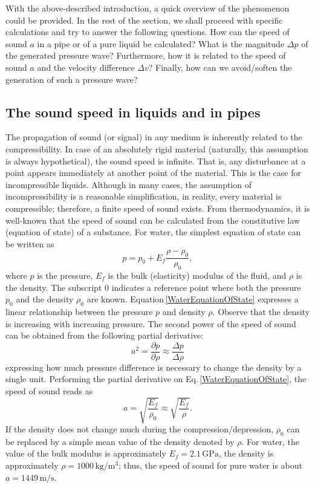 With the above-described introduction, a quick overview of the phenomenon could be provided. In the rest of the section, we shall proceed with specific calculations and try to answer the following questions. How can the speed of sound $a$ in a pipe or of a pure liquid be calculated? What is the magnitude $\Delta p$ of the generated pressure wave? Furthermore, how it is related to the speed of sound $a$ and the velocity difference $\Delta v$? Finally, how can we avoid/soften the generation of such a pressure wave?

\subsection{The sound speed in liquids and in pipes}
The propagation of sound (or signal) in any medium is inherently related to the compressibility. In case of an absolutely rigid material (naturally, this assumption is always hypothetical), the sound speed is infinite. That is, any disturbance at a point appears immediately at another point of the material. This is the case for incompressible liquids. Although in many cases, the assumption of incompressibility is a reasonable simplification, in reality, every material is compressible; therefore, a finite speed of sound exists. From thermodynamics, it is well-known that the speed of sound can be calculated from the constitutive law (equation of state) of a substance. For water, the simplest equation of state can be written as
%
\begin{equation} \label{WaterEquationOfState}
p = p_0 + E_f \frac{\rho - \rho_0}{\rho_0},
\end{equation}
%
where $p$ is the pressure, $E_f$ is the bulk (elasticity) modulus of the fluid, and $\rho$ is the density. The subscript $0$ indicates a reference point where both the pressure $p_0$ and the density $\rho_0$ are known. Equation\,\eqref{WaterEquationOfState} expresses a linear relationship between the pressure $p$ and density $\rho$. Observe that the density is increasing with increasing pressure. The second power of the speed of sound can be obtained from the following partial derivative:
%
\begin{equation}
a^2 = \frac{\partial p}{\partial \rho} \approx \frac{\Delta p}{\Delta \rho}
\end{equation}
%
expressing how much pressure difference is necessary to change the density by a single unit. Performing the partial derivative on Eq.\,\ref{WaterEquationOfState}, the speed of sound reads as
%
\begin{equation}
a = \sqrt{ \frac{E_f}{\rho_0} } \approx \sqrt{ \frac{E_f}{\rho} }.
\end{equation}
%
If the density does not change much during the compression/depression, $\rho_0$ can be replaced by a simple mean value of the density denoted by $\rho$. For water, the value of the bulk modulus is approximately $E_f=2.1\,\mathrm{GPa}$, the density is approximately $\rho=1000\,\mathrm{kg/m^3}$; thus, the speed of sound for pure water is about $a=1449\,\mathrm{m/s}$.
 
